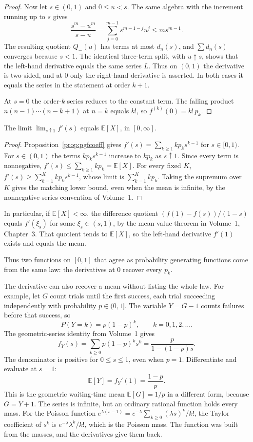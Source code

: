 \begin{proof}
Now let $s\in(0,1)$ and $0\le u<s$. The same algebra with the increment running up to $s$ gives
\[
 \frac{s^m-u^m}{s-u}=\sum_{j=0}^{m-1}s^{m-1-j}u^j\le m s^{m-1}.
\]
The resulting quotient $Q_-(u)$ has terms at most $d_n(s)$, and $\sum d_n(s)$ converges because $s<1$. The identical three-term split, with $u\uparrow s$, shows that the left-hand derivative equals the same series $L$. Thus on $(0,1)$ the derivative is two-sided, and at $0$ only the right-hand derivative is asserted. In both cases it equals the series in the statement at order $k+1$.

At $s=0$ the order-$k$ series reduces to the constant term. The falling product $n(n-1)\cdots(n-k+1)$ at $n=k$ equals $k!$, so $f^{(k)}(0)=k!\,p_k$.
\end{proof}

\begin{proposition}\label{prop:pgfmean}
The limit $\lim_{s\uparrow1}f'(s)$ equals $\mathbb E[X]$, in $[0,\infty]$.
\end{proposition}
\begin{proof}
Proposition~\ref{prop:pgfcoeff} gives $f'(s)=\sum_{k\ge1}kp_k s^{k-1}$ for $s\in[0,1)$. For $s\in(0,1)$ the terms $k p_k s^{k-1}$ increase to $k p_k$ as $s\uparrow1$. Since every term is nonnegative, $f'(s)\le\sum_{k\ge1}kp_k=\mathbb E[X]$. For every fixed $K$, $f'(s)\ge\sum_{k=1}^K kp_k s^{k-1}$, whose limit is $\sum_{k=1}^K kp_k$. Taking the supremum over $K$ gives the matching lower bound, even when the mean is infinite, by the nonnegative-series convention of Volume~1.
\end{proof}

In particular, if $\mathbb E[X]<\infty$, the difference quotient $(f(1)-f(s))/(1-s)$ equals $f'(\xi_s)$ for some $\xi_s\in(s,1)$, by the mean value theorem in Volume~1, Chapter~3. That quotient tends to $\mathbb E[X]$, so the left-hand derivative $f'(1)$ exists and equals the mean.

Thus two functions on $[0,1]$ that agree as probability generating functions come from the same law: the derivatives at $0$ recover every $p_k$.

The derivative can also recover a mean without listing the whole law. For example, let $G$ count trials until the first success, each trial succeeding independently with probability $p\in(0,1]$. The variable $Y=G-1$ counts failures before that success, so
\[
 P(Y=k)=p(1-p)^k,\qquad k=0,1,2,\ldots.
\]
The geometric-series identity from Volume~1 gives
\[
 f_Y(s)=\sum_{k\ge0}p(1-p)^ks^k=\frac{p}{1-(1-p)s}.
\]
The denominator is positive for $0\le s\le1$, even when $p=1$. Differentiate and evaluate at $s=1$:
\[
 \mathbb E[Y]=f_Y'(1)=\frac{1-p}{p}.
\]
This is the geometric waiting-time mean $\mathbb E[G]=1/p$ in a different form, because $G=Y+1$. The series is infinite, but an ordinary rational function holds every mass. For the Poisson function $e^{\lambda(s-1)}=e^{-\lambda}\sum_{k\ge0}(\lambda s)^k/k!$, the Taylor coefficient of $s^k$ is $e^{-\lambda}\lambda^k/k!$, which is the Poisson mass. The function was built from the masses, and the derivatives give them back.

